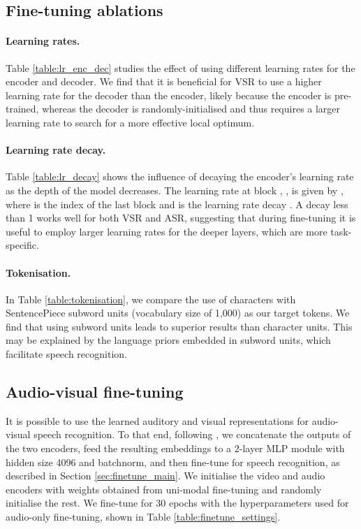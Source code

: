 \documentclass{article} \usepackage{iclr2023_conference,times}
\begin{document}
\subsection{Fine-tuning ablations}
\paragraph{Learning rates.} Table \ref{table:lr_enc_dec} studies the effect of using different learning rates for the encoder and decoder. We find that it is beneficial for VSR to use a higher learning rate for the decoder than the encoder, likely because the encoder is pre-trained, whereas the decoder is randomly-initialised and thus requires a larger learning rate to search for a more effective local optimum.

\paragraph{Learning rate decay.} Table \ref{table:lr_decay} shows the influence of decaying the encoder's learning rate as the depth of the model decreases. The learning rate at block , , is given by , where  is the index of the last block and  is the learning rate decay \citep{clark2020electra}. A decay less than 1 works well for both VSR and ASR, suggesting that during fine-tuning it is useful to employ larger learning rates for the deeper layers, which are more task-specific.

\paragraph{Tokenisation.} In Table \ref{table:tokenisation}, we compare the use of characters with SentencePiece \citep{kudo2018sentencepiece} subword units (vocabulary size of 1,000) as our target tokens. We find that using subword units leads to superior results than character units. This may be explained by the language priors embedded in subword units, which facilitate speech recognition. 

\subsection{Audio-visual fine-tuning}
It is possible to use the learned auditory and visual representations for audio-visual speech recognition. To that end, following \citet{ma2021end}, we concatenate the outputs of the two encoders, feed the resulting embeddings to a 2-layer MLP module with hidden size 4096 and batchnorm, and then fine-tune for speech recognition, as described in Section \ref{sec:finetune_main}. We initialise the video and audio encoders with weights obtained from uni-modal fine-tuning and randomly initialise the rest. We fine-tune for 30 epochs with the hyperparameters used for audio-only fine-tuning, shown in Table \ref{table:finetune_settings}.
\end{document}

